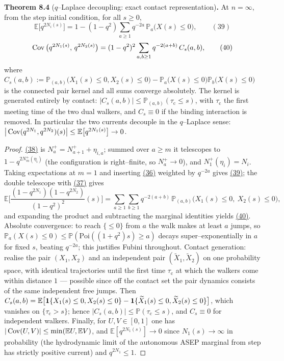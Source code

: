 \documentclass[11pt]{article}
\theoremstyle{plain}
\theoremstyle{definition}
\theoremstyle{remark}
\newcommand{\E}{\mathbb{E}}\newcommand{\PP}{\mathbb{P}}\newcommand{\dd}{\,\mathrm{d}}
\begin{document}
\label{thm_cov}\noindent\textbf{Theorem 8.4} ($q$--Laplace decoupling: exact contact representation)\textbf{.} 
At $n=\infty$, from the step initial condition, for all $s\ge0$,
\label{eq_qmom}
\begin{equation}
  \E\big[q^{2N_i(s)}\big]=1-(1-q^2)\sum_{a\ge1}q^{-2a}\,\PP_a\big(X(s)\le0\big),\qquad(39)
\end{equation}
\label{eq_qcov}
\begin{equation}
  \operatorname{Cov}\big(q^{2N_1(s)},\,q^{2N_2(s)}\big)
  =(1-q^2)^2\sum_{a,b\ge1}q^{-2(a+b)}\,C_s(a,b),\qquad(40)
\end{equation}
where
$C_s(a,b):=\PP_{(a,b)}\big(X_1(s)\le0,X_2(s)\le0\big)
-\PP_a\big(X(s)\le0\big)\PP_b\big(X(s)\le0\big)$ is the connected pair kernel and all
sums converge absolutely. The kernel is generated entirely by contact:
$|C_s(a,b)|\le\PP_{(a,b)}(\tau_{\mathrm c}\le s)$, with $\tau_{\mathrm c}$ the first
meeting time of the two dual walkers, and $C_s\equiv0$ if the binding interaction is
removed. In particular the two currents decouple in the $q$--Laplace sense:
$\big|\Cov(q^{2N_1},q^{2N_2})(s)\big|\le\E\big[q^{2N_1(s)}\big]\to0$.
\par
\begin{proof}
\hyperref[eq_telescope]{(38)} is $N^+_a=N^+_{a+1}+\eta_{i,a}$; summed over $a\ge m$ it
telescopes to $1-q^{2N^+_m(\eta_i)}$ (the configuration is right--finite, so
$N^+_a\to0$), and $N^+_1(\eta_i)=N_i$. Taking expectations at $m=1$ and inserting
\hyperref[eq_tri1]{(36)} weighted by $q^{-2a}$ gives \hyperref[eq_qmom]{(39)}; the double telescope
with \hyperref[eq_tri2]{(37)} gives
\[
  \E\Big[\frac{(1-q^{2N_1})(1-q^{2N_2})}{(1-q^2)^2}(s)\Big]
  =\sum_{a\ge1}\sum_{b\ge1}q^{-2(a+b)}\,\PP_{(a,b)}\big(X_1(s)\le0,\ X_2(s)\le0\big),
\]
and expanding the product and subtracting the marginal identities yields
\hyperref[eq_qcov]{(40)}. Absolute convergence: to reach $\{\le0\}$ from $a$ the walk makes at
least $a$ jumps, so $\PP_a(X(s)\le0)\le\PP(\mathrm{Poi}((1+q^2)s)\ge a)$ decays
super--exponentially in $a$ for fixed $s$, beating $q^{-2a}$; this justifies Fubini
throughout. Contact generation: realise the pair $(X_1,X_2)$ and an independent pair
$(\widetilde X_1,\widetilde X_2)$ on one probability space, with identical
trajectories until the first time $\tau_{\mathrm c}$ at which the walkers come within
distance $1$ --- possible since off the contact set the pair dynamics consists of the
same independent free jumps. Then
$C_s(a,b)=\E\big[\bone\{X_1(s)\le0,X_2(s)\le0\}
-\bone\{\widetilde X_1(s)\le0,\widetilde X_2(s)\le0\}\big]$, which vanishes on
$\{\tau_{\mathrm c}>s\}$; hence $|C_s(a,b)|\le\PP(\tau_{\mathrm c}\le s)$, and
$C_s\equiv0$ for independent walkers. Finally, for $U,V\in[0,1]$ one has
$|\Cov(U,V)|\le\min(\E U,\E V)$, and $\E[q^{2N_1(s)}]\to0$ since $N_1(s)\to\infty$
in probability (the hydrodynamic limit of the autonomous ASEP marginal from step has
strictly positive current) and $q^{2N_1}\le1$.
\end{proof}
\end{document}
